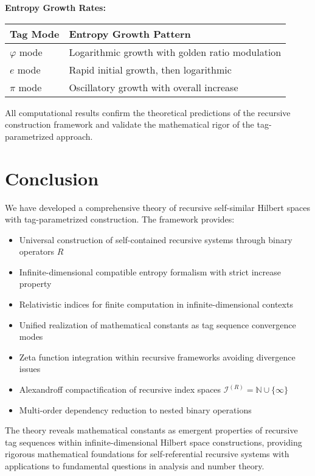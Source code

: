 \documentclass[12pt]{article}
\theoremstyle{plain}
\theoremstyle{definition}
\begin{document}
\textbf{Entropy Growth Rates:}
\begin{center}
\begin{tabular}{|l|l|}
\hline
\textbf{Tag Mode} & \textbf{Entropy Growth Pattern} \\
\hline
$\varphi$ mode & Logarithmic growth with golden ratio modulation \\
$e$ mode & Rapid initial growth, then logarithmic \\
$\pi$ mode & Oscillatory growth with overall increase \\
\hline
\end{tabular}
\end{center}

All computational results confirm the theoretical predictions of the recursive construction framework and validate the mathematical rigor of the tag-parametrized approach.

\section{Conclusion}

We have developed a comprehensive theory of recursive self-similar Hilbert spaces with tag-parametrized construction. The framework provides:

\begin{itemize}
\item Universal construction of self-contained recursive systems through binary operators $R$
\item Infinite-dimensional compatible entropy formalism with strict increase property
\item Relativistic indices for finite computation in infinite-dimensional contexts
\item Unified realization of mathematical constants as tag sequence convergence modes
\item Zeta function integration within recursive frameworks avoiding divergence issues
\item Alexandroff compactification of recursive index spaces $\mathcal{I}^{(R)} = \mathbb{N} \cup \{\infty\}$
\item Multi-order dependency reduction to nested binary operations
\end{itemize}

The theory reveals mathematical constants as emergent properties of recursive tag sequences within infinite-dimensional Hilbert space constructions, providing rigorous mathematical foundations for self-referential recursive systems with applications to fundamental questions in analysis and number theory.
\end{document}
